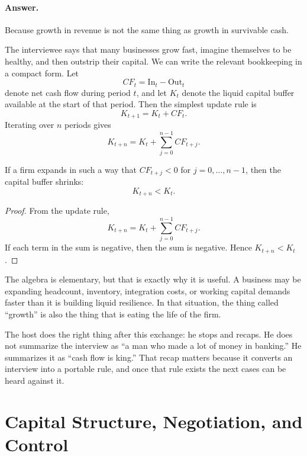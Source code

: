 \paragraph{Answer.} Because growth in revenue is not the same thing as growth in survivable cash.

The interviewee says that many businesses grow fast, imagine themselves to be healthy, and then outstrip their capital. We can write the relevant bookkeeping in a compact form. Let
\begin{equation}
CF_t = \mathrm{In}_t - \mathrm{Out}_t
\end{equation}
denote net cash flow during period \(t\), and let \(K_t\) denote the liquid capital buffer available at the start of that period. Then the simplest update rule is
\begin{equation}
K_{t+1} = K_t + CF_t.
\end{equation}
Iterating over \(n\) periods gives
\begin{equation}
K_{t+n} = K_t + \sum_{j=0}^{n-1} CF_{t+j}.
\end{equation}

\begin{proposition}
If a firm expands in such a way that \(CF_{t+j}<0\) for \(j=0,\dots,n-1\), then the capital buffer shrinks:
\begin{equation}
K_{t+n} < K_t.
\end{equation}
\end{proposition}

\begin{proof}
From the update rule,
\[
K_{t+n} = K_t + \sum_{j=0}^{n-1} CF_{t+j}.
\]
If each term in the sum is negative, then the sum is negative. Hence \(K_{t+n}<K_t\).
\end{proof}

The algebra is elementary, but that is exactly why it is useful. A business may be expanding headcount, inventory, integration costs, or working capital demands faster than it is building liquid resilience. In that situation, the thing called ``growth'' is also the thing that is eating the life of the firm.

The host does the right thing after this exchange: he stops and recaps. He does not summarize the interview as ``a man who made a lot of money in banking.'' He summarizes it as ``cash flow is king.'' That recap matters because it converts an interview into a portable rule, and once that rule exists the next cases can be heard against it.

\section{Capital Structure, Negotiation, and Control}


